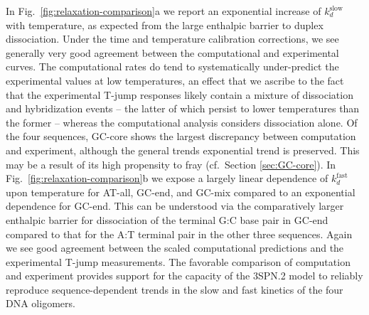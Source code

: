 \documentclass[journal=jpcbfk,manuscript=article]{achemso}
\begin{document}
In Fig.~\ref{fig:relaxation-comparison}a we report an exponential increase of $k_d^\mathrm{slow}$ with temperature, as expected from the large enthalpic barrier to duplex dissociation.\cite{Craig1971RelaxationOligonucleotides,Porschke1971CooperativeTransition,Williams1989LaserDGCATGC} Under the time and temperature calibration corrections, we see generally very good agreement between the computational and experimental curves. The computational rates do tend to systematically under-predict the experimental values at low temperatures, an effect that we ascribe to the fact that the experimental T-jump responses likely contain a mixture of dissociation and hybridization events -- the latter of which persist to lower temperatures than the former -- whereas the computational analysis considers dissociation alone. Of the four sequences, GC-core shows the largest discrepancy between computation and experiment, although the general trends exponential trend is preserved. This may be a result of its high propensity to fray (cf.\ Section \ref{sec:GC-core}). In Fig.~\ref{fig:relaxation-comparison}b we expose a largely linear dependence of $k_d^\mathrm{fast}$ upon temperature for AT-all, GC-end, and GC-mix compared to an exponential dependence for GC-end. This can be understood via the comparatively larger enthalpic barrier for dissociation of the terminal G:C base pair in GC-end compared to that for the A:T terminal pair in the other three sequences. Again we see good agreement between the scaled computational predictions and the experimental T-jump measurements. The favorable comparison of computation and experiment provides support for the capacity of the 3SPN.2 model to reliably reproduce sequence-dependent trends in the slow and fast kinetics of the four DNA oligomers.

\end{document}
